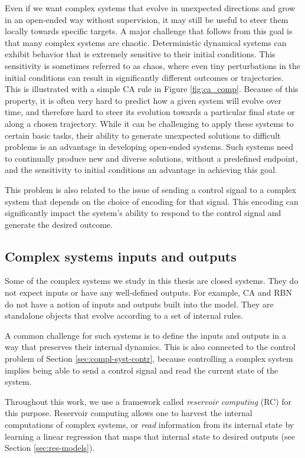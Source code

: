Even if we want complex systems that evolve in unexpected directions and grow in
an open-ended way without supervision, it may still be useful to steer them
locally towards specific targets. A major challenge that follows from this goal
is that many complex systems are chaotic. Deterministic dynamical systems can 
exhibit behavior that is extremely sensitive to their initial conditions. This sensitivity 
is sometimes referred to as chaos, where even tiny perturbations in the initial conditions 
can result in significantly different outcomes or trajectories. This is illustrated 
with a simple \ac{CA} rule in Figure \ref{fig:ca_comp}. 
Because of this property, it is often very hard to predict how a
given system will evolve over time, and therefore hard to steer its evolution
towards a particular final state or along a chosen trajectory. While it can be challenging 
to apply these systems to certain basic tasks, their ability to generate unexpected solutions 
to difficult problems is an advantage in developing open-ended systems. Such systems 
need to continually produce new and diverse solutions, without a 
predefined endpoint, and the sensitivity to initial conditions an advantage in 
achieving this goal.

This problem is also related to the issue of sending a control signal to a
complex system that depends on the choice of encoding for that signal. This
encoding can significantly impact the system's ability to respond to the control 
signal and generate the desired outcome. 

\subsection{Complex systems inputs and outputs\label{sec:compl-syst-inputs}}

Some of the complex systems we study in this thesis are closed systems. They do
not expect inputs or have any well-defined outputs. For example, \ac{CA} and
\ac{RBN} do not have a notion of inputs and outputs built into the model. They
are standalone objects that evolve according to a set of internal rules.

A common challenge for such systems is to define the inputs and outputs in a way
that preserves their internal dynamics. This is also connected to the control
problem of Section \ref{sec:compl-syst-contr}, because controlling a complex
system implies being able to send a control signal and read the current
state of the system.

Throughout this work, we use a framework called \emph{reservoir computing} (RC) for this 
purpose. Reservoir
computing allows one to harvest the internal computations of complex systems, or
\emph{read} information from its internal state by learning a linear regression
that maps that internal state to desired outputs (see Section
\ref{sec:res-models}).



